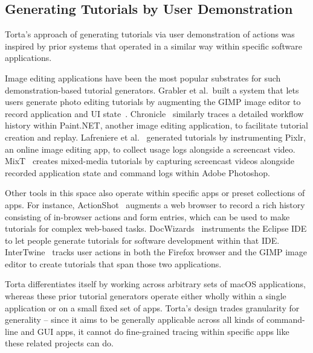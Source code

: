 \subsection{Generating Tutorials by User Demonstration}

Torta's approach of generating tutorials via user demonstration of
actions was inspired by prior systems that operated in a similar way within
specific software applications.

Image editing applications have been the most popular substrates for
such demonstration-based tutorial generators. Grabler et al.\ built a
system that lets users generate photo editing tutorials by augmenting
the GIMP image editor to record application and UI state~\cite{Grabler2009}.
Chronicle~\cite{Grossman2010} similarly traces a detailed workflow history
within Paint.NET, another image editing application, to facilitate
tutorial creation and replay.
%
%
Lafreniere et al.~\cite{Lafreniere2014} generated tutorials by
instrumenting Pixlr, an online image editing app, to collect usage logs
alongside a screencast video.
%
MixT~\cite{Chi2012} creates mixed-media tutorials by capturing
screencast videos alongside recorded application state and command logs
within Adobe Photoshop.

Other tools in this space also operate within specific apps or preset
collections of apps. For instance, ActionShot~\cite{Li2010} augments a
web browser to record a rich history consisting of in-browser actions
and form entries, which can be used to make tutorials for complex
web-based tasks. DocWizards~\cite{Bergman2005} instruments the Eclipse
IDE to let people generate tutorials for software development within
that IDE. InterTwine~\cite{Fourney2014} tracks user actions in both the
Firefox browser and the GIMP image editor to create tutorials that span
those two applications.

Torta differentiates itself by working across arbitrary sets of macOS
applications, whereas these prior tutorial generators operate either
wholly within a single application or on a small fixed set of apps.
Torta's design trades granularity for generality -- since it aims to be
generally applicable across all kinds of command-line and GUI apps, it
cannot do fine-grained tracing within specific apps like these related
projects can do.
